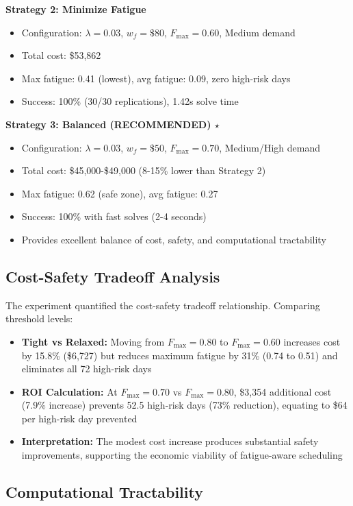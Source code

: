 \documentclass[11pt,letterpaper]{article}
\begin{document}
\textbf{Strategy 2: Minimize Fatigue}
\begin{itemize}[leftmargin=*]
    \item Configuration: $\lambda=0.03$, $w_f=\$80$, $F_{\max}=0.60$, Medium demand
    \item Total cost: \$53,862
    \item Max fatigue: 0.41 (lowest), avg fatigue: 0.09, zero high-risk days
    \item Success: 100\% (30/30 replications), 1.42s solve time
\end{itemize}

\textbf{Strategy 3: Balanced (RECOMMENDED) $\star$}
\begin{itemize}[leftmargin=*]
    \item Configuration: $\lambda=0.03$, $w_f=\$50$, $F_{\max}=0.70$, Medium/High demand
    \item Total cost: \$45,000-\$49,000 (8-15\% lower than Strategy 2)
    \item Max fatigue: 0.62 (safe zone), avg fatigue: 0.27
    \item Success: 100\% with fast solves (2-4 seconds)
    \item Provides excellent balance of cost, safety, and computational tractability
\end{itemize}

\subsection{Cost-Safety Tradeoff Analysis}

The experiment quantified the cost-safety tradeoff relationship. Comparing threshold levels:
\begin{itemize}[leftmargin=*]
    \item \textbf{Tight vs Relaxed:} Moving from $F_{\max}=0.80$ to $F_{\max}=0.60$ increases cost by 15.8\% (\$6,727) but reduces maximum fatigue by 31\% (0.74 to 0.51) and eliminates all 72 high-risk days
    \item \textbf{ROI Calculation:} At $F_{\max}=0.70$ vs $F_{\max}=0.80$, \$3,354 additional cost (7.9\% increase) prevents 52.5 high-risk days (73\% reduction), equating to \$64 per high-risk day prevented
    \item \textbf{Interpretation:} The modest cost increase produces substantial safety improvements, supporting the economic viability of fatigue-aware scheduling
\end{itemize}

\subsection{Computational Tractability}
\end{document}
